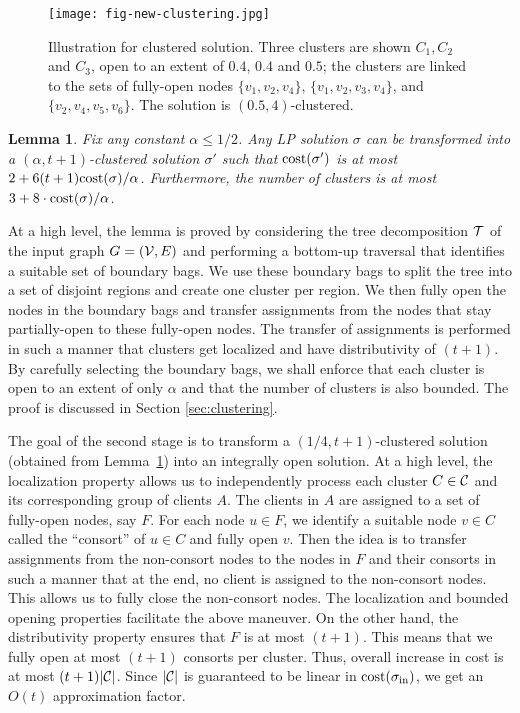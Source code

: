 \documentclass[11pt]{article}
\newtheorem{lemma}[theorem]{Lemma}
\newcommand{\calC} {{\cal C}}
\newcommand{\calV} {{\cal V}}
\newcommand{\myin} {{\rm in}}
\newcommand{\sigmain} {\sigma_{\myin}}
\newcommand{\cost} {{\rm cost}}
\newcommand{\calT} {{\cal T}}
\begin{document}
\begin{figure}[t]
\centering
\texttt{[image: fig-new-clustering.jpg]}
\caption{Illustration for clustered solution. 
	Three clusters are shown $C_1, C_2$ and $C_3$, open to an extent of $0.4$, $0.4$ and $0.5$;
	the clusters are linked to the sets of fully-open nodes $\{v_1, v_2, v_4\}$, $\{v_1, v_2, v_3, v_4\}$, and $\{v_2, v_4, v_5, v_6\}$.
	The solution is $(0.5, 4)$-clustered.
}
\label{fig:clustering}
\end{figure}


\begin{lemma}
	\label{lem:clustering}
	Fix any constant $\alpha \leq 1/2$. Any LP solution $\sigma$ can be transformed into 
	a $(\alpha, t+1)$-clustered solution $\sigma'$ such that
	$\cost(\sigma')$ is at most $2 + 6(t+1)\cost(\sigma)/\alpha$.
	Furthermore, the number of clusters is at most $3+ 8\cdot \cost(\sigma)/\alpha$.
\end{lemma}

At a high level, the lemma is proved by considering the tree decomposition $\calT$ of the input graph $G=(\calV, E)$
and performing a bottom-up traversal that identifies a suitable set of boundary bags. 
We use these boundary bags to split the tree into a set of disjoint regions
and create one cluster per region. We then fully open the nodes in the boundary bags
and transfer assignments from the nodes that stay partially-open to these fully-open nodes.
The transfer of assignments is performed in such a manner that clusters get localized and have distributivity of $(t+1)$. 
By carefully selecting the boundary bags, we shall enforce that each cluster is open to an extent of only $\alpha$
and that the number of clusters is also bounded. The proof is discussed in Section \ref{sec:clustering}.

The goal of the second stage is to transform a $(1/4, t+1)$-clustered solution (obtained from Lemma~\ref{lem:clustering}) 
into an integrally open solution.  
At a high level, the localization property allows us to independently 
process each cluster $C\in \calC$ and its corresponding group of clients $A$. 
The clients in $A$ are assigned to a set of fully-open nodes, say $F$.
For each node $u\in F$, we identify a suitable node $v\in C$ called the ``consort'' of $u \in C$ and fully open $v$. 
Then the idea is to transfer assignments from the non-consort nodes to the nodes in $F$ and their consorts
in such a manner that at the end, no client is assigned to the non-consort nodes.
This allows us to fully close the non-consort nodes. The localization and bounded opening properties
facilitate the above maneuver. On the other hand, the distributivity property ensures
that $F$ is at most $(t+1)$. This means that we fully open at most $(t+1)$ consorts per cluster.
Thus, overall increase in cost is at most $(t+1)|\calC|$. Since $|\calC|$ is 
guaranteed to be linear in $\cost(\sigmain)$, we get an $O(t)$ approximation factor.
\end{document}
